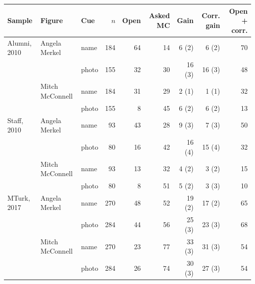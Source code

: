 \begin{tabular}{lllrrrrrr}
\toprule
Sample & Figure & Cue & $n$ & Open & Asked MC & Gain & Corr. gain & Open + corr. \\
\midrule
Alumni, 2010 & Angela Merkel & name & 184 & 64 & 14 & 6 (2) & 6 (2) & 70 \\
 &  & photo & 155 & 32 & 30 & 16 (3) & 16 (3) & 48 \\
 & Mitch McConnell & name & 184 & 31 & 29 & 2 (1) & 1 (1) & 32 \\
 &  & photo & 155 & 8 & 45 & 6 (2) & 6 (2) & 13 \\
Staff, 2010 & Angela Merkel & name & 93 & 43 & 28 & 9 (3) & 7 (3) & 50 \\
 &  & photo & 80 & 16 & 42 & 16 (4) & 15 (4) & 32 \\
 & Mitch McConnell & name & 93 & 13 & 32 & 4 (2) & 3 (2) & 15 \\
 &  & photo & 80 & 8 & 51 & 5 (2) & 3 (3) & 10 \\
MTurk, 2017 & Angela Merkel & name & 270 & 48 & 52 & 19 (2) & 17 (2) & 65 \\
 &  & photo & 284 & 44 & 56 & 25 (3) & 23 (3) & 68 \\
 & Mitch McConnell & name & 270 & 23 & 77 & 33 (3) & 31 (3) & 54 \\
 &  & photo & 284 & 26 & 74 & 30 (3) & 27 (3) & 54 \\
\bottomrule
\end{tabular}
